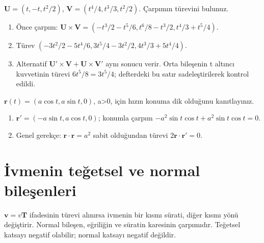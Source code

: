 \begin{tcolorbox}[title={Örnek 3.21 | Vektörel çarpımın türevini iki yoldan almak},colframe=accent]\(\mathbf U=(t,-t,t^2/2)\), \(\mathbf V=(t^4/4,t^3/3,t^2/2)\). Çarpımın türevini bulunuz.
\par{}\end{tcolorbox}
\begin{tcolorbox}[title={Adım adım çözüm},colback=green!3!white,colframe=green]\begin{enumerate}
\item Önce çarpım: \(\mathbf U\times\mathbf V=(-t^3/2-t^5/6,t^6/8-t^3/2,t^4/3+t^5/4)\).
\item Türev \((-3t^2/2-5t^4/6,3t^5/4-3t^2/2,4t^3/3+5t^4/4)\).
\item Alternatif \(\mathbf U\prime\times\mathbf V+\mathbf U\times\mathbf V\prime\) aynı sonucu verir. Orta bileşenin t altıncı kuvvetinin türevi \(6t^5/8=3t^5/4\); defterdeki bu satır sadeleştirilerek kontrol edildi.
\end{enumerate}\end{tcolorbox}
\begin{tcolorbox}[title={Örnek 3.22 | Sabit normun türevi},colframe=accent]\(\mathbf r(t)=(a\cos t,a\sin t,0)\), a>0, için hızın konuma dik olduğunu kanıtlayınız.
\par{}\end{tcolorbox}
\begin{tcolorbox}[title={Adım adım çözüm},colback=green!3!white,colframe=green]\begin{enumerate}
\item \(\mathbf r\prime=(-a\sin t,a\cos t,0)\); konumla çarpım \(-a^2\sin t\cos t+a^2\sin t\cos t=0\).
\item Genel gerekçe: \(\mathbf r\cdot\mathbf r=a^2\) sabit olduğundan türevi \(2\mathbf r\cdot\mathbf r\prime=0\).
\end{enumerate}\end{tcolorbox}
\section{İvmenin teğetsel ve normal bileşenleri}
\(\mathbf v=v\mathbf T\) ifadesinin türevi alınırsa ivmenin bir kısmı sürati, diğer kısmı yönü değiştirir. Normal bileşen, eğriliğin ve süratin karesinin çarpımıdır. Teğetsel katsayı negatif olabilir; normal katsayı negatif değildir.


